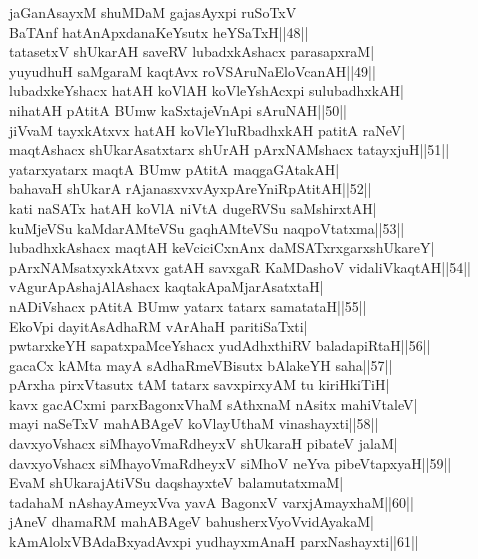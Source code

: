 \documentclass{article}
\begin{document}
jaGanAsayxM shuMDaM gajasAyxpi ruSoTxV\\
BaTAnf hatAnApxdanaKeYsutx heYSaTxH||48||\\
tatasetxV shUkarAH saveRV lubadxkAshacx parasapxraM|\\
yuyudhuH saMgaraM kaqtAvx roVSAruNaEloVcanAH||49||\\
lubadxkeYshacx hatAH koVlAH koVleYshAcxpi sulubadhxkAH|\\
nihatAH pAtitA BUmw kaSxtajeVnApi sAruNAH||50||\\
jiVvaM tayxkAtxvx hatAH koVleYluRbadhxkAH patitA raNeV|\\
maqtAshacx shUkarAsatxtarx shUrAH pArxNAMshacx tatayxjuH||51||\\
yatarxyatarx maqtA BUmw pAtitA maqgaGAtakAH|\\
bahavaH shUkarA rAjanasxvxvAyxpAreYniRpAtitAH||52||\\
kati naSATx hatAH koVlA niVtA dugeRVSu saMshirxtAH|\\
kuMjeVSu kaMdarAMteVSu gaqhAMteVSu naqpoVtatxma||53||\\
lubadhxkAshacx maqtAH keVciciCxnAnx daMSATxrxgarxshUkareY|\\
pArxNAMsatxyxkAtxvx gatAH savxgaR KaMDashoV vidaliVkaqtAH||54||\\
vAgurApAshajAlAshacx kaqtakApaMjarAsatxtaH|\\
nADiVshacx pAtitA BUmw yatarx tatarx samatataH||55||\\
EkoVpi dayitAsAdhaRM vArAhaH paritiSaTxti|\\
pwtarxkeYH sapatxpaMceYshacx yudAdhxthiRV baladapiRtaH||56||\\
gacaCx kAMta mayA sAdhaRmeVBisutx bAlakeYH saha||57||\\
pArxha pirxVtasutx tAM tatarx savxpirxyAM tu kiriHkiTiH|\\
kavx gacACxmi parxBagonxVhaM sAthxnaM nAsitx mahiVtaleV|\\
mayi naSeTxV mahABAgeV koVlayUthaM vinashayxti||58||\\
davxyoVshacx siMhayoVmaRdheyxV shUkaraH pibateV jalaM|\\
davxyoVshacx siMhayoVmaRdheyxV siMhoV neYva pibeVtapxyaH||59||\\
EvaM shUkarajAtiVSu daqshayxteV balamutatxmaM|\\
tadahaM nAshayAmeyxVva yavA BagonxV varxjAmayxhaM||60||\\
jAneV dhamaRM mahABAgeV bahusherxVyoVvidAyakaM|\\
kAmAlolxVBAdaBxyadAvxpi yudhayxmAnaH parxNashayxti||61||\\
\end{document}
